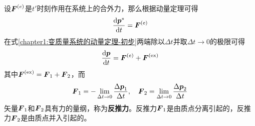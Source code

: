 
设$\boldsymbol{F}^{(e)}$是$t'$时刻作用在系统上的合外力，那么根据动量定理可得
\begin{equation}
	\dfrac{\mathrm{d} \boldsymbol{p}^*}{\mathrm{d} t} = \boldsymbol{F}^{(e)}
\end{equation}
在式\eqref{chapter1:变质量系统的动量定理-初步}两端除以$\Delta t$并取$\Delta t\to 0$的极限可得
\begin{equation}
	\dfrac{\mathrm{d} \boldsymbol{p}}{\mathrm{d} t} = \boldsymbol{F}^{(e)}+\boldsymbol{F}^{(\text{ex})}
\end{equation}
其中$\boldsymbol{F}^{(\text{ex})} = \boldsymbol{F}_1+\boldsymbol{F}_2$，而
\begin{equation}
	\boldsymbol{F}_1 = -\lim_{\Delta t\to 0} \frac{\Delta \boldsymbol{p}_1}{\Delta t},\quad \boldsymbol{F}_2 = \lim_{\Delta t\to 0} \frac{\Delta \boldsymbol{p}_2}{\Delta t}
\end{equation}
矢量$\boldsymbol{F}_1$和$\boldsymbol{F}_2$具有力的量纲，称为{\bf 反推力}。反推力$\boldsymbol{F}_1$是由质点分离引起的，反推力$\boldsymbol{F}_2$是由质点并入引起的。

